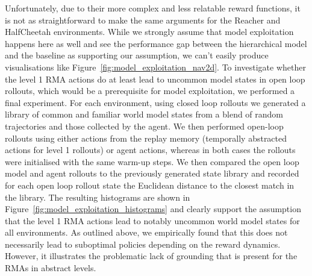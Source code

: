 \documentclass{article}
\begin{document}
Unfortunately, due to their more complex and less relatable reward functions, it is not as straightforward to make the same arguments for the Reacher and HalfCheetah environments. While we strongly assume that model exploitation happens here as well and see the performance gap between the hierarchical model and the baseline as supporting our assumption, we can't easily produce visualisations like Figure~\ref{fig:model_exploitation_nav2d}. To investigate whether the level 1 RMA actions do at least lead to uncommon model states in open loop rollouts, which would be a prerequisite for model exploitation, we performed a final experiment. For each environment, using closed loop rollouts we generated a library of common and familiar world model states from a blend of random trajectories and those collected by the agent. We then performed open-loop rollouts using either actions from the replay memory (temporally abstracted actions for level 1 rollouts) or agent actions, whereas in both cases the rollouts were initialised with the same warm-up steps. We then compared the open loop model and agent rollouts to the previously generated state library and recorded for each open loop rollout state the Euclidean distance to the closest match in the library. The resulting histograms are shown in Figure~\ref{fig:model_exploitation_histograms} and clearly support the assumption that the level 1 RMA actions lead to notably uncommon world model states for all environments. As outlined above, we empirically found that this does not necessarily lead to suboptimal policies depending on the reward dynamics. However, it illustrates the problematic lack of grounding that is present for the RMAs in abstract levels.
\end{document}
